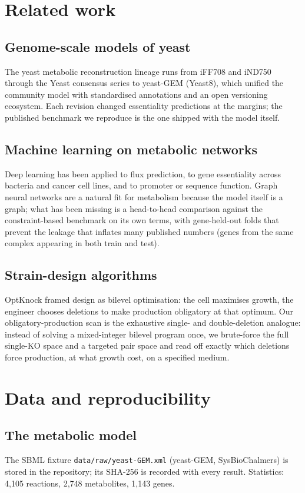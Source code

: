 \documentclass[12pt]{article}
\begin{document}
\section{Related work}
\subsection{Genome-scale models of yeast}
The yeast metabolic reconstruction lineage runs from iFF708 and iND750
through the Yeast consensus series to yeast-GEM (Yeast8), which unified the
community model with standardised annotations and an open versioning
ecosystem. Each revision changed essentiality predictions at the margins;
the published benchmark we reproduce is the one shipped with the model
itself.
\subsection{Machine learning on metabolic networks}
Deep learning has been applied to flux prediction, to gene essentiality
across bacteria and cancer cell lines, and to promoter or sequence
function. Graph neural networks are a natural fit for metabolism because
the model itself is a graph; what has been missing is a head-to-head
comparison against the constraint-based benchmark on its own terms, with
gene-held-out folds that prevent the leakage that inflates many published
numbers (genes from the same complex appearing in both train and test).
\subsection{Strain-design algorithms}
OptKnock framed design as bilevel optimisation: the cell maximises growth,
the engineer chooses deletions to make production obligatory at that
optimum. Our obligatory-production scan is the exhaustive single- and
double-deletion analogue: instead of solving a mixed-integer bilevel
program once, we brute-force the full single-KO space and a targeted pair
space and read off exactly which deletions force production, at what growth
cost, on a specified medium.

\section{Data and reproducibility}
\subsection{The metabolic model}
The SBML fixture \texttt{data/raw/yeast-GEM.xml} (yeast-GEM, SysBioChalmers)
is stored in the repository; its SHA-256 is recorded with every result.
Statistics: 4{,}105 reactions, 2{,}748 metabolites, 1{,}143 genes.
\end{document}

